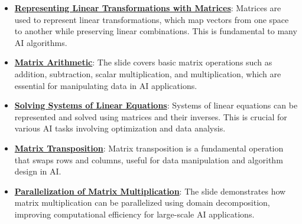 \documentclass{article}%
\begin{document}
\begin{itemize}[leftmargin=*]%
\item \href{https://purdue.brightspace.com/d2l/common/assets/pdfjs-d2l-dist/1.0.14-legacy/web/viewer.html?file=\%2Fcontent\%2Fenforced\%2F1095467-wl.202510.CS.24300.001\%2F04L1-Linear Algebra Primer.pdf\%3Fou\%3D1095467\&lang=en-us\&container=d2l-fileviewer-rendered-pdf\&fullscreen=d2l-fileviewer-rendered-pdf-dialog\&height=667#page=5}{\textbf{Representing Linear Transformations with Matrices}}: Matrices are used to represent linear transformations, which map vectors from one space to another while preserving linear combinations. This is fundamental to many AI algorithms.%
\item \href{https://purdue.brightspace.com/d2l/common/assets/pdfjs-d2l-dist/1.0.14-legacy/web/viewer.html?file=\%2Fcontent\%2Fenforced\%2F1095467-wl.202510.CS.24300.001\%2F04L1-Linear Algebra Primer.pdf\%3Fou\%3D1095467\&lang=en-us\&container=d2l-fileviewer-rendered-pdf\&fullscreen=d2l-fileviewer-rendered-pdf-dialog\&height=667#page=9}{\textbf{Matrix Arithmetic}}: The slide covers basic matrix operations such as addition, subtraction, scalar multiplication, and multiplication, which are essential for manipulating data in AI applications.%
\item \href{https://purdue.brightspace.com/d2l/common/assets/pdfjs-d2l-dist/1.0.14-legacy/web/viewer.html?file=\%2Fcontent\%2Fenforced\%2F1095467-wl.202510.CS.24300.001\%2F04L1-Linear Algebra Primer.pdf\%3Fou\%3D1095467\&lang=en-us\&container=d2l-fileviewer-rendered-pdf\&fullscreen=d2l-fileviewer-rendered-pdf-dialog\&height=667#page=11}{\textbf{Solving Systems of Linear Equations}}: Systems of linear equations can be represented and solved using matrices and their inverses. This is crucial for various AI tasks involving optimization and data analysis.%
\item \href{https://purdue.brightspace.com/d2l/common/assets/pdfjs-d2l-dist/1.0.14-legacy/web/viewer.html?file=\%2Fcontent\%2Fenforced\%2F1095467-wl.202510.CS.24300.001\%2F04L1-Linear Algebra Primer.pdf\%3Fou\%3D1095467\&lang=en-us\&container=d2l-fileviewer-rendered-pdf\&fullscreen=d2l-fileviewer-rendered-pdf-dialog\&height=667#page=16}{\textbf{Matrix Transposition}}: Matrix transposition is a fundamental operation that swaps rows and columns, useful for data manipulation and algorithm design in AI.%
\item \href{https://purdue.brightspace.com/d2l/common/assets/pdfjs-d2l-dist/1.0.14-legacy/web/viewer.html?file=\%2Fcontent\%2Fenforced\%2F1095467-wl.202510.CS.24300.001\%2F04L1-Linear Algebra Primer.pdf\%3Fou\%3D1095467\&lang=en-us\&container=d2l-fileviewer-rendered-pdf\&fullscreen=d2l-fileviewer-rendered-pdf-dialog\&height=667#page=18}{\textbf{Parallelization of Matrix Multiplication}}: The slide demonstrates how matrix multiplication can be parallelized using domain decomposition, improving computational efficiency for large-scale AI applications.%

\end{itemize}
\end{document}
